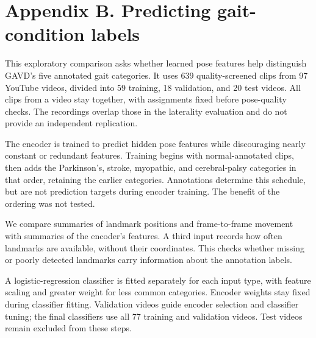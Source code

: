 \documentclass{article}
\begin{document}
\FloatBarrier\clearpage

\section{Appendix B. Predicting gait-condition
labels}\label{appendix-b.-predicting-gait-condition-labels}

This exploratory comparison asks whether learned pose features help
distinguish GAVD's five annotated gait categories. It uses 639
quality-screened clips from 97 YouTube videos, divided into 59 training,
18 validation, and 20 test videos. All clips from a video stay together,
with assignments fixed before pose-quality checks. The recordings
overlap those in the laterality evaluation and do not provide an
independent replication.

The encoder is trained to predict hidden pose features while
discouraging nearly constant or redundant features. Training begins with
normal-annotated clips, then adds the Parkinson's, stroke, myopathic,
and cerebral-palsy categories in that order, retaining the earlier
categories. Annotations determine this schedule, but are not prediction
targets during encoder training. The benefit of the ordering was not
tested.

We compare summaries of landmark positions and frame-to-frame movement
with summaries of the encoder's features. A third input records how
often landmarks are available, without their coordinates. This checks
whether missing or poorly detected landmarks carry information about the
annotation labels.

A logistic-regression classifier is fitted separately for each input
type, with feature scaling and greater weight for less common
categories. Encoder weights stay fixed during classifier fitting.
Validation videos guide encoder selection and classifier tuning; the
final classifiers use all 77 training and validation videos. Test videos
remain excluded from these steps.
\end{document}
